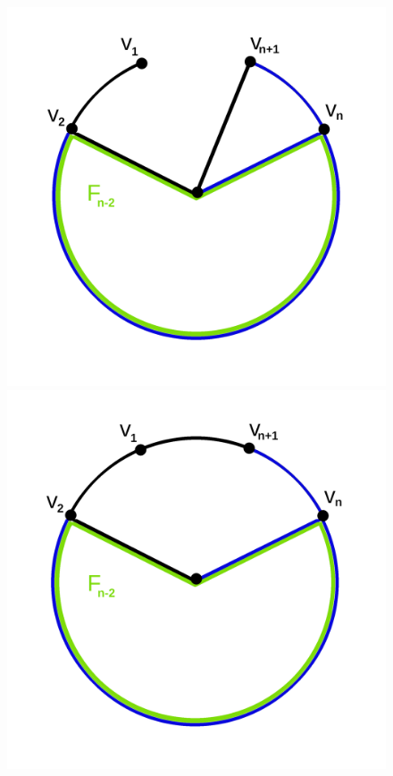 \begin{figure}[H]
    \centering
    \begin{minipage}{0.45\textwidth}
        \centering
        \includegraphics[width=1\textwidth]{mn2.png}
        \caption{}
 \label{mn2} %
    \end{minipage}\hfill
    \begin{minipage}{0.45\textwidth}
        \centering
        \includegraphics[width=1\textwidth]{mn3.png}
        \caption{}
 \label{mn3} %
    \end{minipage}
\end{figure}
